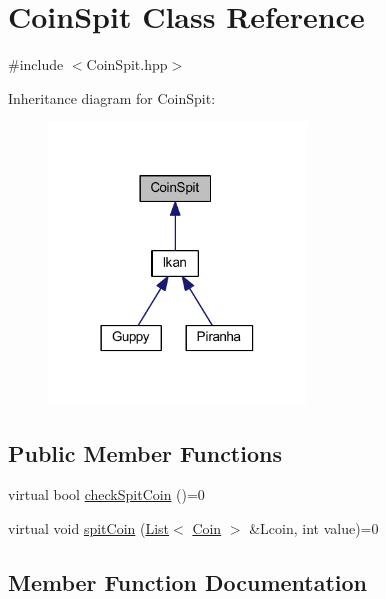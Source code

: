 \hypertarget{class_coin_spit}{}\section{Coin\+Spit Class Reference}
\label{class_coin_spit}


{\ttfamily \#include $<$Coin\+Spit.\+hpp$>$}



Inheritance diagram for Coin\+Spit\+:\nopagebreak
\begin{figure}[H]
\begin{center}
\leavevmode
\includegraphics[width=194pt]{class_coin_spit__inherit__graph}
\end{center}
\end{figure}
\subsection*{Public Member Functions}
\begin{DoxyCompactItemize}
\item 
virtual bool \mbox{\hyperlink{class_coin_spit_a9471108f825dc67a35ac1a35444b84fd}{check\+Spit\+Coin}} ()=0
\item 
virtual void \mbox{\hyperlink{class_coin_spit_a336f45a90c4b0b57017b45a5c68f12a7}{spit\+Coin}} (\mbox{\hyperlink{class_list}{List}}$<$ \mbox{\hyperlink{class_coin}{Coin}} $>$ \&Lcoin, int value)=0
\end{DoxyCompactItemize}


\subsection{Member Function Documentation}
\mbox{\label{class_coin_spit_a9471108f825dc67a35ac1a35444b84fd}} 
